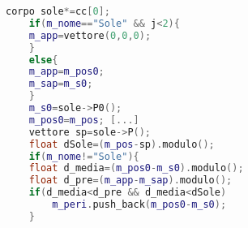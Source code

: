 \begin{lstlisting}[language=C++]
    corpo sole*=cc[0];
    if(m_nome=="Sole" && j<2){
	m_app=vettore(0,0,0);
    }
    else{
	m_app=m_pos0;
	m_sap=m_s0;
    }	
    m_s0=sole->P0();
    m_pos0=m_pos; [...]
    vettore sp=sole->P();
    float dSole=(m_pos-sp).modulo();
    if(m_nome!="Sole"){
	float d_media=(m_pos0-m_s0).modulo();
	float d_pre=(m_app-m_sap).modulo();
	if(d_media<d_pre && d_media<dSole)
		m_peri.push_back(m_pos0-m_s0);
    }
\end{lstlisting}